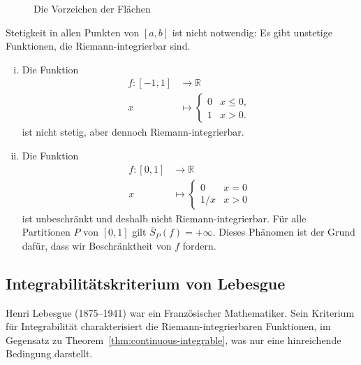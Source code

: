\documentclass[../main.tex]{subfiles}
\begin{document}
\begin{figure}[htb]
  \centering
  
  \caption{Die Vorzeichen der Flächen}%
  \label{fig:riemann-integral}
\end{figure}

\begin{remark}
  Stetigkeit in allen Punkten von $[a, b]$ ist
  nicht notwendig: Es gibt unstetige Funktionen,
  die Riemann-integrierbar sind.
\end{remark}

\begin{examples}
  \leavevmode
  \begin{enumerate}[(i)]
    \item Die Funktion
      \begin{align*}
        f \colon [-1, 1] & \to \mathbb{R} \\
        x & \mapsto 
        \begin{cases}
          0 & x \leq 0,\\
          1 & x > 0.
        \end{cases}
      \end{align*}
      ist nicht stetig, aber dennoch Riemann-integrierbar.
    \item Die Funktion
      \begin{align*}
        f \colon [0, 1] & \to \mathbb{R} \\
        x & \mapsto 
        \begin{cases}
          0 & x = 0 \\
          1/x & x > 0
        \end{cases}
      \end{align*}
      ist unbeschränkt und deshalb nicht Riemann-integrierbar.
      Für alle Partitionen $P$ von $[0, 1]$ gilt
      $
      \overline S_P(f) = + \infty$.
      Dieses Phänomen ist der Grund dafür, dass
      wir Beschränktheit von $f$ fordern.
  \end{enumerate}
\end{examples}

\subsection*{Integrabilitätskriterium von Lebesgue}
Henri Lebesgue (1875--1941) war ein Französischer Mathematiker.
Sein Kriterium für Integrabilität charakterisiert die
Riemann-integrierbaren Funktionen, im Gegensatz zu
Theorem~\ref{thm:continuous-integrable}, was nur eine
hinreichende Bedingung darstellt.
\end{document}
